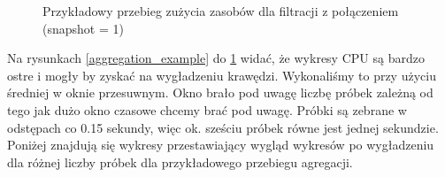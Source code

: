 \begin{figure}[!h]
  \centering
  \hfill
  \caption{Przykładowy przebieg zużycia zasobów dla filtracji z połączeniem (snapshot = 1)}
  \label{filtration-join_example}
  
\end{figure}

Na rysunkach \ref{aggregation_example} do \ref{filtration-join_example} widać, że wykresy CPU są bardzo ostre i mogły by zyskać na wygładzeniu krawędzi. Wykonaliśmy to przy użyciu średniej w oknie przesuwnym. Okno brało pod uwagę liczbę próbek zależną od tego jak dużo okno czasowe chcemy brać pod uwagę. Próbki są zebrane w odstępach co 0.15 sekundy, więc ok. sześciu próbek równe jest jednej sekundzie. Poniżej znajdują się wykresy przestawiający wygląd wykresów po wygładzeniu dla różnej liczby próbek dla przykładowego przebiegu agregacji.

